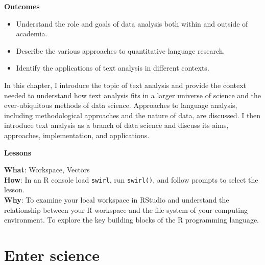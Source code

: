 \documentclass[
  letterpaper,
]{latex/krantz}
\providecommand{\tightlist}{%
  \setlength{\itemsep}{0pt}\setlength{\parskip}{0pt}}\usepackage{longtable,booktabs,array}
\theoremstyle{definition}
\theoremstyle{remark}
\begin{document}
\begin{tcolorbox}[enhanced jigsaw, colframe=quarto-callout-color-frame, breakable, bottomrule=.15mm, arc=.35mm, left=2mm, opacityback=0, rightrule=.15mm, colback=white, toprule=.15mm, leftrule=.75mm]

\textbf{ Outcomes}

\begin{itemize}
\tightlist
\item
  Understand the role and goals of data analysis both within and outside
  of academia.
\item
  Describe the various approaches to quantitative language research.
\item
  Identify the applications of text analysis in different contexts.
\end{itemize}

\end{tcolorbox}

In this chapter, I introduce the topic of text analysis and provide the
context needed to understand how text analysis fits in a larger universe
of science and the ever-ubiquitous methods of data science. Approaches
to language analysis, including methodological approaches and the nature
of data, are discussed. I then introduce text analysis as a branch of
data science and discuss its aims, approaches, implementation, and
applications.

\begin{tcolorbox}[enhanced jigsaw, colframe=quarto-callout-color-frame, breakable, bottomrule=.15mm, arc=.35mm, left=2mm, opacityback=0, rightrule=.15mm, colback=white, toprule=.15mm, leftrule=.75mm]

\textbf{ Lessons}

\textbf{What}: Workspace, Vectors\\
\textbf{How}: In an R console load \texttt{swirl}, run \texttt{swirl()},
and follow prompts to select the lesson.\\
\textbf{Why}: To examine your local workspace in RStudio and understand
the relationship between your R workspace and the file system of your
computing environment. To explore the key building blocks of the R
programming language.

\end{tcolorbox}

\section{Enter science}\label{sec-enter-science}
\end{document}
